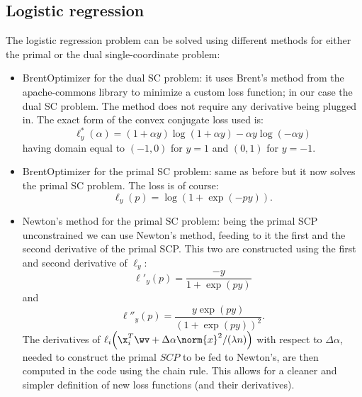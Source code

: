 \subsection{Logistic regression}
The logistic regression problem can be solved using different methods for either the primal or the dual single-coordinate problem:
\begin{itemize}
\item BrentOptimizer for the dual SC problem: it uses Brent's method from the apache-commons library to minimize a custom loss function; in our case the dual SC problem. The method does not require any derivative being plugged in. The exact form of the convex conjugate loss used is:
$$
\ell^*_y(\alpha) = (1+\alpha y)\log{(1+\alpha y)} - \alpha y \log{(-\alpha y)}
$$	
having domain equal to $(-1,0)$ for $y = 1$ and $(0,1)$ for $y = -1$.

\item BrentOptimizer for the primal SC problem: same as before but it now solves the primal SC problem. The loss is of course:
$$
\ell_y(p) = \log{(1+\exp{(-py)})}.
$$

\item Newton's method for the primal SC problem: being the primal SCP unconstrained we can use Newton's method, feeding to it the first and the second derivative of the primal SCP. This two are constructed using the first and second derivative of $\ell_y$:
$$
\ell'_y(p) = \frac{-y}{1+\exp{(py)}}
$$
and
$$
\ell''_y(p) = \frac{y \exp(py)}{(1+\exp{(py)})^2}.
$$
The derivatives of $\ell_i\Big(\x_i^T \wv + \Delta\alpha \norm{x}^2/(\lambda n) \Big)$ with respect to $\Delta\alpha$, needed to construct the primal $SCP$ to be fed to Newton's, are then computed in the code using the chain rule. This allows for a cleaner and simpler definition of new loss functions (and their derivatives).

\end{itemize}
